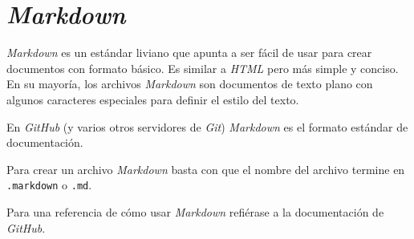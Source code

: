 \section{\textit{Markdown}}
  \textit{Markdown} es un estándar liviano que apunta a ser fácil de usar para crear documentos con
  formato básico.
  Es similar a \textit{HTML} pero más simple y conciso.
  En su mayoría, los archivos \textit{Markdown} son documentos de texto plano con algunos caracteres
  especiales para definir el estilo del texto.

  En \textit{GitHub} (y varios otros servidores de \textit{Git}) \textit{Markdown} es el formato 
  estándar de documentación.

  Para crear un archivo \textit{Markdown} basta con que el nombre del archivo termine en 
  \texttt{.markdown} o \texttt{.md}.

  Para una referencia de cómo usar \textit{Markdown} refiérase a la documentación de 
  \textit{GitHub}\autocite{gh-markdown}.
    